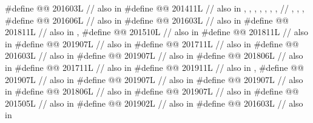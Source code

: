 \begin{codeblock}
#define @@               201603L // also in 
#define @@  201411L
  // also in , , , , , , ,
  // , , , 
#define @@                               201606L // also in 
#define @@                             201603L // also in 
#define @@                   201811L // also in , 
#define @@                          201510L // also in 
#define @@                    201811L // also in 
#define @@                  201907L // also in 
#define @@                      201711L // also in 
#define @@        201603L // also in 
#define @@     201907L // also in 
#define @@                        201806L // also in 
#define @@                 201711L // also in 
#define @@       201911L // also in , 
#define @@                       201907L // also in 
#define @@                           201907L // also in 
#define @@                        201907L // also in 
#define @@                          201806L // also in 
#define @@                            201907L // also in 
#define @@                     201505L // also in 
#define @@              201902L // also in 
#define @@              201603L // also in 

\end{codeblock}
